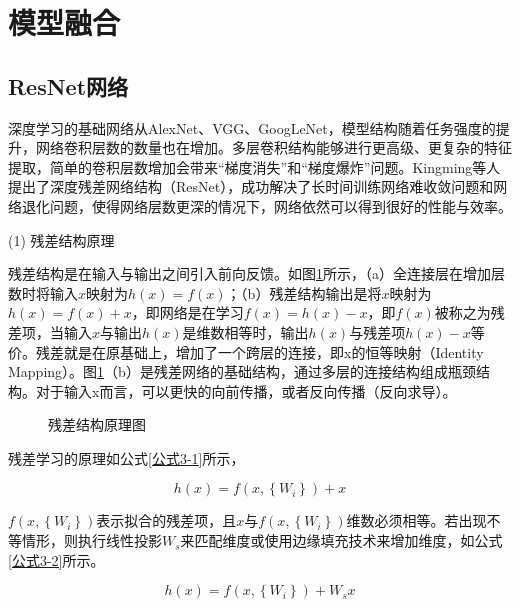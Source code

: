 \section{模型融合}

\subsection{ResNet网络}

深度学习的基础网络从AlexNet、VGG、GoogLeNet，模型结构随着任务强度的提升，网络卷积层数的数量也在增加。多层卷积结构能够进行更高级、更复杂的特征提取，简单的卷积层数增加会带来“梯度消失”和“梯度爆炸”问题。Kingming等人\cite{70}提出了深度残差网络结构（ResNet），成功解决了长时间训练网络难收敛问题和网络退化问题，使得网络层数更深的情况下，网络依然可以得到很好的性能与效率。

(1)	残差结构原理

残差结构是在输入与输出之间引入前向反馈。如图\ref{图3.1}所示，（a）全连接层在增加层数时将输入$x$映射为$h\left(x\right)=f\left(x\right)$；（b）残差结构输出是将$x$映射为$h\left(x\right)=f\left(x\right)+x$，即网络是在学习$f\left(x\right)=h\left(x\right)-x$，即$f\left(x\right)$被称之为残差项，当输入$x$与输出$h\left(x\right)$是维数相等时，输出$h\left(x\right)$与残差项$h\left(x\right)-x$等价。残差就是在原基础上，增加了一个跨层的连接，即x的恒等映射（Identity Mapping）。图\ref{图3.1}（b）是残差网络的基础结构，通过多层的连接结构组成瓶颈结构。对于输入x而言，可以更快的向前传播，或者反向传播（反向求导）。

\begin{figure}[!ht]
	\centering
	\hfil
	\caption{残差结构原理图}
	\label{图3.1}
\end{figure}


残差学习的原理如公式\ref{公式3-1}所示，

\begin{equation}\label{公式3-1}
	h\left(x\right)=f\left(x,\left\{W_i\right\}\right)+x
\end{equation}


$f\left(x,\left\{W_i\right\}\right)$表示拟合的残差项，且$x$与$f\left(x,\left\{W_i\right\}\right)$维数必须相等。若出现不等情形，则执行线性投影$W_s$来匹配维度或使用边缘填充技术来增加维度，如公式\ref{公式3-2}所示。

\begin{equation}\label{公式3-2}
	h\left(x\right)=f\left(x,\left\{W_i\right\}\right)+W_sx
\end{equation}

